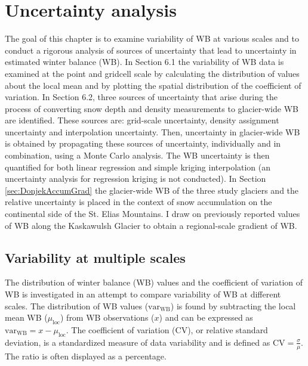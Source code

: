 \documentclass{sfuthesis}
\begin{document}
\chapter{Uncertainty analysis}
\label{sec:UncertaintyAnalysis}

The goal of this chapter is to examine variability of WB at various scales and to conduct a rigorous analysis of sources of uncertainty that lead to uncertainty in estimated winter balance (WB). In Section 6.1 the variability of WB data is examined at the point and gridcell scale by calculating the distribution of values about the local mean and by plotting the spatial distribution of the coefficient of variation. In Section 6.2, three sources of uncertainty that arise during the process of converting snow depth and density measurements to glacier-wide WB are identified. These sources are: grid-scale uncertainty, density assignment uncertainty and interpolation uncertainty. Then, uncertainty in glacier-wide WB is obtained by propagating these sources of uncertainty, individually and in combination, using a Monte Carlo analysis. The WB uncertainty is then quantified for both linear regression and simple kriging interpolation (an uncertainty analysis for regression kriging is not conducted). 
In Section \ref{sec:DonjekAccumGrad} the glacier-wide WB  of the three study glaciers and the relative uncertainty is placed in the context of snow accumulation on the continental side of the St. Elias Mountains. I draw on previously reported values of WB along the Kaskawulsh Glacier to obtain a regional-scale gradient of WB.

\section{Variability at multiple scales}

The distribution of winter balance (WB) values and the coefficient of variation of WB is investigated in an attempt to compare variability of WB at different scales. The distribution of WB values ($\mathrm{var}_{\mathrm{WB}}$) is found by subtracting the local mean WB ($\mu_\mathrm{loc}$) from WB observations ($x$) and can be expressed as $\mathrm{var}_{\mathrm{WB}} = x-\mu_{\mathrm{loc}}$. The coefficient of variation (CV), or relative standard deviation, is a standardized measure of data variability and is defined as $\mathrm{CV} = \frac{\sigma}{\mu}$. The ratio is often displayed as a percentage.
\end{document}
